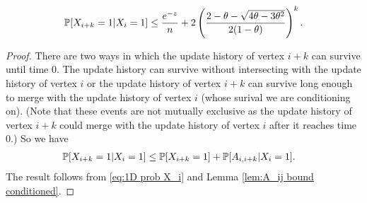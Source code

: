 	\begin{lemma}
		\label{lem:X_i+k given X_i}
		\begin{equation}
			\label{eq:prob X_i+k = 1|X_i = 1}
			\mathbb{P}[X_{i+k} = 1| X_i = 1] \leq \frac{e^{-z}}{n} + 2\left(\frac{2 - \theta - \sqrt{4\theta - 3\theta^2}}{2(1 - \theta)}\right)^k.
		\end{equation}
	\end{lemma}
	\begin{proof}
		There are two ways in which the update history of vertex $i+k$ can survive until time $0$. The update history can survive without intersecting with the update history of vertex $i$ or the update history of vertex $i+k$ can survive long enough to merge with the update history of vertex $i$ (whose surival we are conditioning on). (Note that these events are not mutually exclusive as the update history of vertex $i+k$ could merge with the update history of vertex $i$ after it reaches time $0$.) So we have
		\begin{align}
			\mathbb{P}[X_{i+k} = 1| X_i = 1] &\leq \mathbb{P}[X_{i+k} = 1] + \mathbb{P}[A_{i,i+k} | X_i = 1].
		\end{align}
		The result follows from \eqref{eq:1D prob X_i} and Lemma \ref{lem:A_ij bound conditioned}.
	\end{proof}